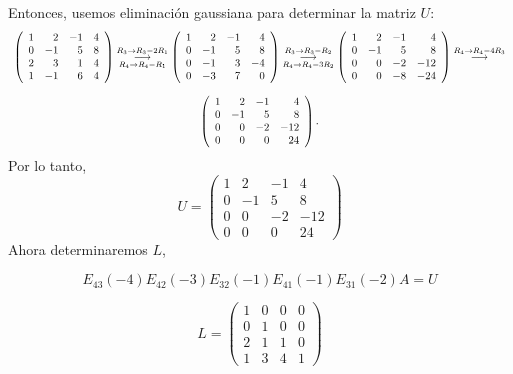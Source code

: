 \documentclass[11pt,letterpaper]{article}
\newcommand{\grstep}[2][\relax]{%
   \ensuremath{\mathrel{
       {\mathop{\longrightarrow}\limits^{#2\mathstrut}_{
                                     \begin{subarray}{l} #1 \end{subarray}}}}}}
\begin{document}
\begin{enumerate}
Entonces, usemos eliminación gaussiana para determinar la matriz $U$:
\begin{equation*}
\begin{array}{c}
\left(
\begin{array}{rrrr}
 1 &  2 & -1 & 4\\
 0 & -1 &  5 & 8\\
 2 &  3 &  1 & 4\\
 1 & -1 &  6 & 4
\end{array}
\right)%
\grstep[R_4 \rightarrow R_4-R_1]{R_3 \rightarrow R_3-2R_1}
%
\left(
\begin{array}{rrrr}
 1 &  2 & -1 &  4\\
 0 & -1 &  5 &  8\\
 0 & -1 &  3 & -4\\
 0 & -3 &  7 &  0
\end{array}
\right) %
\grstep[R_4 \rightarrow R_4-3R_2]{R_3 \rightarrow R_3-R_2}
% 
\left(
\begin{array}{rrrr}
 1 &  2 & -1 &   4\\
 0 & -1 &  5 &   8\\
 0 &  0 & -2 & -12\\
 0 &  0 & -8 & -24
\end{array}
\right) %
\grstep[]{R_4 \rightarrow R_4-4R_3}
\\
\\
\left(
\begin{array}{rrrr}
 1 &  2 & -1 &   4\\
 0 & -1 &  5 &   8\\
 0 &  0 & -2 & -12\\
 0 &  0 &  0 & 24
\end{array}
\right).
\end{array} 
\end{equation*}
Por lo tanto, 
\begin{equation*}
U=\left(
\begin{array}{rrrr}
 1 &  2 & -1 &   4\\
 0 & -1 &  5 &   8\\
 0 &  0 & -2 & -12\\
 0 &  0 &  0 & 24
\end{array}
\right)
\end{equation*}
Ahora determinaremos $L$, 

$$E_{43}(-4)E_{42}(-3)E_{32}(-1)E_{41}(-1)E_{31}(-2)A=U $$

$$L=\left(
\begin{array}{rrrr}
 1 &  0 & 0 &  0\\
 0 &  1 & 0 &  0\\
 2 &  1 & 1 &  0\\
 1 &  3 & 4 &  1
\end{array}\right)$$


\end{enumerate}
\end{document}

